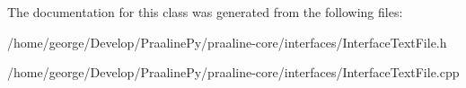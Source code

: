 The documentation for this class was generated from the following files\+:\begin{DoxyCompactItemize}
\item 
/home/george/\+Develop/\+Praaline\+Py/praaline-\/core/interfaces/Interface\+Text\+File.\+h\item 
/home/george/\+Develop/\+Praaline\+Py/praaline-\/core/interfaces/Interface\+Text\+File.\+cpp\end{DoxyCompactItemize}
